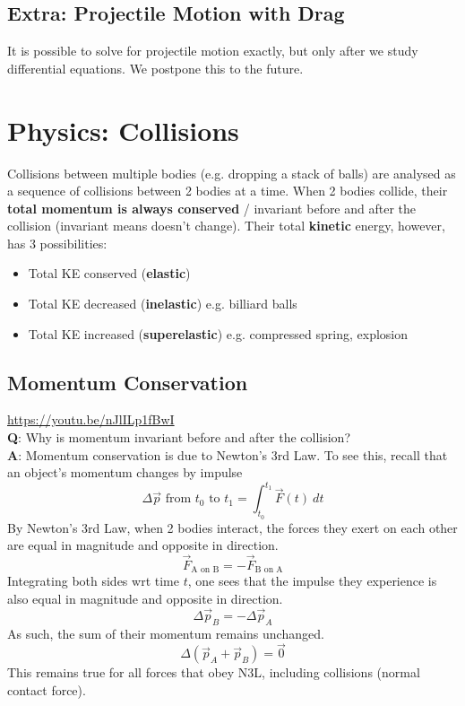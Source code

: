 \documentclass{article}
\begin{document}
\subsection{Extra: Projectile Motion with Drag}
It is possible to solve for projectile motion exactly, but only after we study differential equations. We postpone this to the future.
\newpage
\section{Physics: Collisions}
Collisions between multiple bodies (e.g. dropping a stack of balls) are analysed as a sequence of collisions between 2 bodies at a time. When 2 bodies collide, their \textbf{total momentum is always conserved} / invariant before and after the collision (invariant means doesn't change). Their total \textbf{kinetic} energy, however, has 3 possibilities:
\begin{itemize}
    \item Total KE conserved (\textbf{elastic})
    \item Total KE decreased (\textbf{inelastic}) e.g. billiard balls
    \item Total KE increased (\textbf{superelastic}) e.g. compressed spring, explosion
\end{itemize}
\subsection{Momentum Conservation}
\url{https://youtu.be/nJlILp1fBwI}\\
\textbf{Q}: Why is momentum invariant before and after the collision? \\[10pt]
\textbf{A}: Momentum conservation is due to Newton's 3rd Law. To see this, recall that an object's momentum changes by impulse 
$$\Delta \vec{p} \text{ from } t_0 \text{ to } t_1 = \int_{t_0}^{t_1} \vec{F}(t)\ dt$$
By Newton's 3rd Law, when 2 bodies interact, the forces they exert on each other are equal in magnitude and opposite in direction. 
$$\vec{F}_{\text{A on B}} = -\vec{F}_{\text{B on A}}$$
Integrating both sides wrt time $t$, one sees that the impulse they experience is also equal in magnitude and opposite in direction.
$$\Delta \vec{p}_B = - \Delta \vec{p}_A$$
As such, the sum of their momentum remains unchanged.
$$\Delta(\vec{p}_A + \vec{p}_B) = \vec{0}$$
This remains true for all forces that obey N3L, including collisions (normal contact force). 
\end{document}

